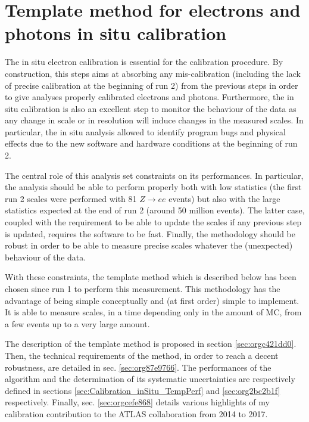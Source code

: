 \chapter{Template method for electrons and photons in situ calibration}
\label{sec:orgfabb545}

The in situ electron calibration is essential for the calibration procedure.
By construction, this steps aims at absorbing any mis-calibration (including the lack of precise calibration at the beginning of run 2) from the previous steps in order to give analyses properly calibrated electrons and photons.
Furthermore, the in situ calibration is also an excellent step to monitor the behaviour of the data as any change in scale or in resolution will induce changes in the measured scales.
In particular, the in situ analysis allowed to identify program bugs and physical effects due to the new software and hardware conditions at the beginning of run 2.

The central role of this analysis set constraints on its performances.
In particular, the analysis should be able to perform properly both with low statistics (the first run 2 scales were performed with 81 $Z\rightarrow ee$ events) but also with the large statistics expected at the end of run 2 (around 50 million events).
The latter case, coupled with the requirement to be able to update the scales if any previous step is updated, requires the software to be fast.
Finally, the methodology should be robust in order to be able to measure precise scales whatever the (unexpected) behaviour of the data.

With these constraints, the template method which is described below has been chosen since run 1 to perform this measurement.
This methodology has the advantage of being simple conceptually and (at first order) simple to implement.
It is able to measure scales, in a time depending only in the amount of MC, from a few events up to a very large amount.

The description of the template method is proposed in section \ref{sec:orgc421dd0}.
Then, the technical requirements of the method, in order to reach a decent robustness, are detailed in sec. \ref{sec:org87e9766}.
The performances of the algorithm and the determination of its systematic uncertainties are respectively defined in sections \ref{sec:Calibration_inSitu_TempPerf} and \ref{sec:org2bc2b1f} respectively.
Finally, sec. \ref{sec:orgcefe868} details various highlights of my calibration contribution to the ATLAS collaboration from 2014 to 2017.


